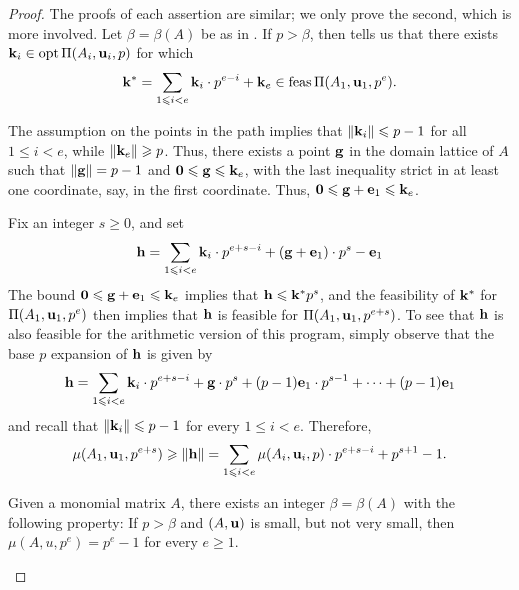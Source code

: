 \documentclass[11pt]{amsart}
\begin{document}
\begin{proof} The proofs of each assertion are similar; we only prove the second, which is more involved.  Let $\beta = \beta(A)$ be as in .  If $p > \beta$, then  tells us that there exists $\mathbf{k}_i \in \operatorname{opt} \Pi(A_i, \mathbf{u}_i, p)$ for which \[ \mathbf{k}^{\ast} = \sum_{1 \leqslant i < e} \mathbf{k}_i \cdot p^{e-i} + \mathbf{k}_e \in \operatorname{feas} \Pi(A_1, \mathbf{u}_1, p^e).\]

  The assumption on the points in the path implies that $\| \mathbf{k}_i \| \leqslant p-1$ for all $1 \leq i < e$, while $\| \mathbf{k}_e \| \geqslant p$.  Thus, there exists a point $\mathbf{g}$ in the domain lattice of $A$ such that $\| \mathbf{g} \| = p-1$ and $\mathbf{0} \leqslant \mathbf{g} \leqslant \mathbf{k}_e$, with the last inequality strict in at least one coordinate, say, in the first coordinate.  Thus, $\mathbf{0} \leqslant \mathbf{g} + \mathbf{e}_1 \leqslant \mathbf{k}_e$.

Fix an integer $s \geq 0$, and set   
%
\[ \mathbf{h} = \sum_{1 \leqslant i < e} \mathbf{k}_i \cdot p^{e+s-i} + (\mathbf{g} + \mathbf{e}_1) \cdot p^{s} - \mathbf{e}_1 \]
%
The bound $\mathbf{0} \leqslant \mathbf{g} + \mathbf{e}_1 \leqslant \mathbf{k}_e$ implies that $\mathbf{h} \leqslant \mathbf{k}^{\ast}  p^s$, and the feasibility of $\mathbf{k}^{\ast}$ for $\Pi(A_1, \mathbf{u}_1, p^e)$ then implies that  $\mathbf{h}$ is feasible for $\Pi(A_1, \mathbf{u}_1, p^{e+s})$.  To see that $\mathbf{h}$ is also feasible for the arithmetic version of this program, simply observe that the base $p$ expansion of $\mathbf{h}$ is given by 
%
\[ \mathbf{h} = \sum_{1 \leqslant i < e} \mathbf{k}_i \cdot p^{e+s-i} + \mathbf{g} \cdot p^{s} + (p-1) \mathbf{e}_1 \cdot p^{s-1} + \cdots + (p-1) \mathbf{e}_1 \]
%
and recall that $\| \mathbf{k}_i \| \leqslant p-1$ for every $1 \leq i < e$.  Therefore, 
%
\[ \mu(A_1, \mathbf{u}_1, p^{e+s}) \geqslant \| \mathbf{h} \| = \sum_{1 \leqslant i < e} \mu(A_i, \mathbf{u}_i, p) \cdot p^{e+s-i}+ p^{s+1}-1. \]
%

\begin{corollary}
Given a monomial matrix $A$, there exists an integer $\beta = \beta(A)$ with the following property\textup: If $p > \beta$ and $(A, \mathbf{u})$ is small, but not very small, then $\mu(A,u,p^e) = p^e-1$ for every $e \geq 1$.

\end{corollary}

\end{proof}


\end{document}
